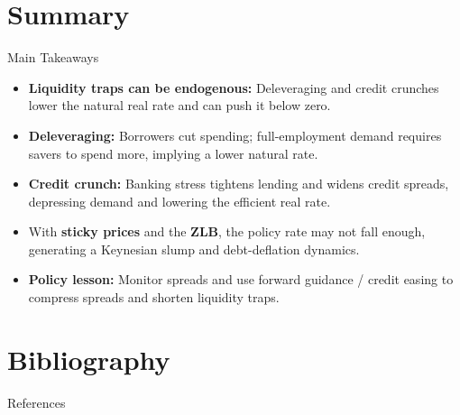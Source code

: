 \documentclass[11pt,aspectratio=169]{beamer}
\begin{document}
\section{Summary}

\begin{frame}{Main Takeaways}
\small
\begin{itemize}
  \item \textbf{Liquidity traps can be endogenous:} Deleveraging and credit crunches lower the natural real rate and can push it below zero.
  \item \textbf{Deleveraging:} Borrowers cut spending; full-employment demand requires savers to spend more, implying a lower natural rate.
  \item \textbf{Credit crunch:} Banking stress tightens lending and widens credit spreads, depressing demand and lowering the efficient real rate.
  \item With \textbf{sticky prices} and the \textbf{ZLB}, the policy rate may not fall enough, generating a Keynesian slump and debt-deflation dynamics.
  \item \textbf{Policy lesson:} Monitor spreads and use forward guidance / credit easing to compress spreads and shorten liquidity traps.
\end{itemize}
\end{frame}



\section{Bibliography}

\begin{frame}{References}
\printbibliography
\end{frame}
\end{document}

